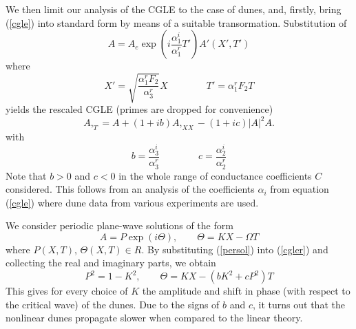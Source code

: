 \documentclass[12pt,a4paper,twocolumn,fleqn]{narms}
\begin{document}
We then limit our analysis of the CGLE to the case of dunes, and,
firstly, bring (\ref{cgle}) into standard form by means of a suitable
transormation. Substitution of
\begin{equation}
A=A_e \exp(i \frac{\alpha_1^i}{\alpha_1^r}T')A'(X',T')
\end{equation}
where
\begin{equation}
X'=\sqrt{\frac{\alpha_1^r F_2}{\alpha_3^r}} X \qquad\qquad
T'=\alpha_1^r F_2 T
\end{equation}
yields the rescaled CGLE (primes are dropped for convenience)
\begin{equation}
A,_T = A + (1+ib) A,_{XX} - (1+ic) |A|^2 A.
\label{cgler}
\end{equation}
with
\begin{equation}
b=\frac{\alpha_3^i}{\alpha_3^r} \qquad\qquad
c=\frac{\alpha_2^i}{\alpha_2^r}
\end{equation}
Note that $b>0$ and $c<0$ in the whole range of conductance
coefficients $C$ considered. This follows from an analysis of the
coefficients $\alpha_i$ from equation (\ref{cgle}) where dune
data from various experiments are used.

We consider periodic plane-wave solutions of the form
\begin{equation}
A=P \exp ( i \Theta), \qquad
\Theta= KX -\Omega T
\label{persol}
\end{equation}
where $P(X,T)$, $\Theta(X,T) \in {R}$. By substituting
(\ref{persol}) into (\ref{cgler}) and collecting the real and
imaginary parts, we obtain
\begin{equation}
P^2 = 1 - K^2, \qquad
\Theta = K X - (b K^2 + c P^2) T
\label{order0}
\end{equation}
This gives for every choice of $K$ the amplitude and shift in phase
(with respect to the critical wave) of the dunes. Due to the signs of
$b$ and $c$, it turns out that the nonlinear dunes propagate slower
when compared to the linear theory.



\begin{table}
\caption{Margin settings for A4 size paper and letter size paper.}
\end{table}
\end{document}
